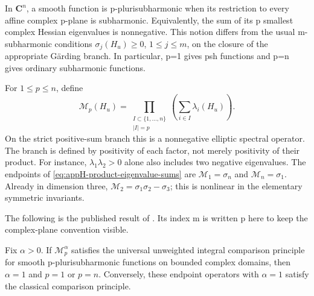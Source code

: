 In \(\mathbf C^n\), a smooth function is p-plurisubharmonic when
its restriction to every affine complex p-plane is subharmonic.
Equivalently, the sum of its p smallest complex Hessian eigenvalues
is nonnegative. This notion differs from the usual m-subharmonic
conditions \(\sigma_j(H_u)\geq0\), \(1\leq j\leq m\), on the
closure of the appropriate G\"arding branch. In particular,
p=1 gives psh functions and p=n gives ordinary subharmonic functions.

For \(1\leq p\leq n\), define
\[
 \tag{H.13}\label{eq:appH-product-eigenvalue-sums}
 \mathcal M_p(H_u)=
       \prod_{\substack{I\subset\{1,\ldots,n\}\\|I|=p}}
                          \left(\sum_{i\in I}\lambda_i(H_u)\right).
\]
On the strict positive-sum branch this is a nonnegative elliptic
spectral operator. The branch is defined by positivity of each
factor, not merely positivity of their product. For instance,
\(\lambda_1\lambda_2>0\) alone also includes two negative eigenvalues.
The endpoints of \eqref{eq:appH-product-eigenvalue-sums} are
\(\mathcal M_1=\sigma_n\) and \(\mathcal M_n=\sigma_1\).
Already in dimension three,
\(\mathcal M_2=\sigma_1\sigma_2-\sigma_3\); this is nonlinear
in the elementary symmetric invariants.

The following is the published result of
\cite[Theorem~4.1, pp.~1004--1008]{Dinew22SadullaevPublished}.
Its index m is written p here to keep the complex-plane convention visible.

\begin{theorem}\label{thm:appH-Dinew-product-comparison}
Fix \(\alpha>0\). If \(\mathcal M_p^\alpha\) satisfies the
universal unweighted integral comparison principle for smooth
p-plurisubharmonic functions on bounded complex domains, then
\(\alpha=1\) and \(p=1\) or \(p=n\). Conversely, these endpoint
operators with \(\alpha=1\) satisfy the classical comparison principle.
\end{theorem}

